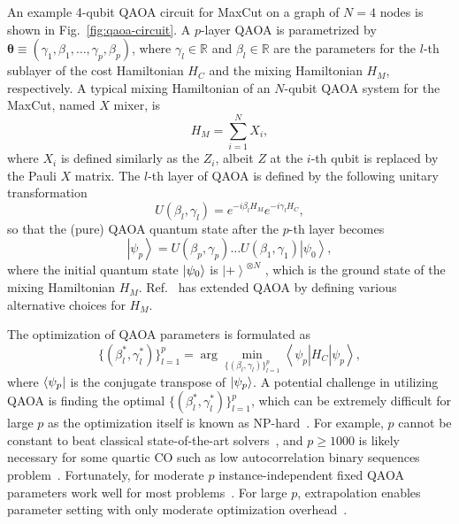 \documentclass[conference,10pt]{IEEEtran}
\begin{document}
An example 4-qubit QAOA circuit for MaxCut on a graph of $N=4$ nodes is shown in Fig.~\ref{fig:qaoa-circuit}. 
A $p$-layer QAOA is parametrized by $\bm{\theta} \equiv (\gamma_1, \beta_1, \ldots, \gamma_p, \beta_p)$, where $\gamma_l \in \mathbb{R}$ and $\beta_l \in \mathbb{R}$ are the parameters for the $l$-th sublayer of the cost Hamiltonian $H_C$ and the mixing Hamiltonian $H_M$, respectively. A typical mixing Hamiltonian of an $N$-qubit QAOA system for the MaxCut, named $X$ mixer, is 
\begin{equation}
H_M = \sum_{i=1}^N X_i,\label{eq:ham_mixing}
\end{equation}
where $X_i$ is defined similarly as the $Z_i$, albeit $Z$ at the $i$-th qubit is replaced by the Pauli $X$ matrix. 
The $l$-th layer of QAOA is defined by the following unitary transformation
\begin{equation}
    U(\beta_l, \gamma_l) = e^{-i\beta_l H_M} e^{-i \gamma_l H_C}, \label{eq:layeri_qaoa}
\end{equation}
so that the (pure) QAOA quantum state after the $p$-th layer becomes
\begin{equation}
    \left|\psi_p\right> = U\left(\beta_p, \gamma_p\right)\ldots U\left(\beta_1, \gamma_1\right) \left|\psi_0\right>, \label{eq:qaoa-final-state}
\end{equation}
where the initial quantum state $\ket{\psi_0}$ is $\left|+\right>^{\otimes N}$ %
, which is the ground state of the mixing Hamiltonian $H_M$. Ref.~\cite{Hadfield_2019} has extended QAOA by defining various alternative choices for $H_M$. %

The optimization of QAOA parameters is formulated as 
\begin{equation}
   \{(\beta^*_l, \gamma^*_l)\}_{l=1}^p = \arg \min_{\{(\beta_l, \gamma_l)\}_{l=1}^p} \left<\psi_p\right| {H}_C \left|\psi_p\right>, \label{eq:qaoa-param-opt}
\end{equation}
where $\bra{\psi_p}$ is the conjugate transpose of $\ket{\psi_p}$. 
A potential challenge in utilizing QAOA is finding the optimal $\{(\beta^*_l, \gamma^*_l)\}_{l=1}^p$, which can be extremely difficult for large $p$ as the optimization itself is known as NP-hard~\cite{Bittel2021}. For example, $p$ cannot be constant to beat classical state-of-the-art solvers~\cite{farhi2020quantum}, and $p \ge 1000$ is likely necessary for some quartic CO such as low autocorrelation binary sequences problem~\cite{shaydulin2023evidence}.  %
Fortunately, for moderate $p$ instance-independent fixed QAOA parameters work well for most problems~\cite{shaydulin2019multistart,Boulebnane2024,shaydulin2023evidence,Sureshbabu2024,bassoQAOAsk,he2024parameter}. For large $p$, extrapolation enables parameter setting with only moderate optimization overhead~\cite{zhou2020quantum}.
\end{document}
